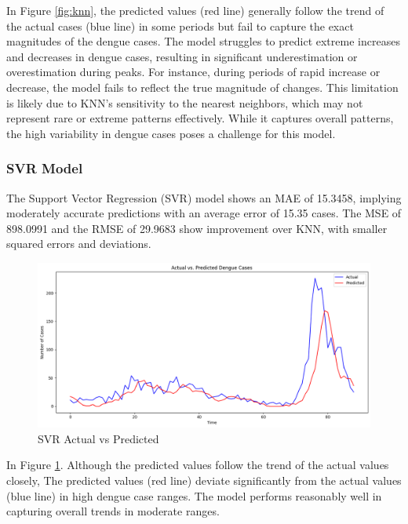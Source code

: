 \documentclass[runningheads]{llncs}
\begin{document}
In Figure \ref{fig:knn}, the predicted values (red line) generally follow the trend of the actual cases (blue line) in some periods but fail to capture the exact magnitudes of the dengue cases. The model struggles to predict extreme increases and decreases in dengue cases, resulting in significant underestimation or overestimation during peaks. For instance, during periods of rapid increase or decrease, the model fails to reflect the true magnitude of changes. This limitation is likely due to KNN’s sensitivity to the nearest neighbors, which may not represent rare or extreme patterns effectively. While it captures overall patterns, the high variability in dengue cases poses a challenge for this model.

\subsubsection{SVR Model}
The Support Vector Regression (SVR) model shows an MAE of 15.3458, implying moderately accurate predictions with an average error of 15.35 cases. The MSE of 898.0991 and the RMSE of 29.9683 show improvement over KNN, with smaller squared errors and deviations.
\begin{figure}[h!]
    \centering
    \includegraphics[width=1\linewidth]{image/svr plot.png}
    \caption{SVR Actual vs Predicted}
    \label{fig:svr}
\end{figure}

In Figure \ref{fig:svr}. Although the predicted values follow the trend of the actual values closely, The predicted values (red line) deviate significantly from the actual values (blue line) in high dengue case ranges. The model performs reasonably well in capturing overall trends in moderate ranges.
\end{document}
